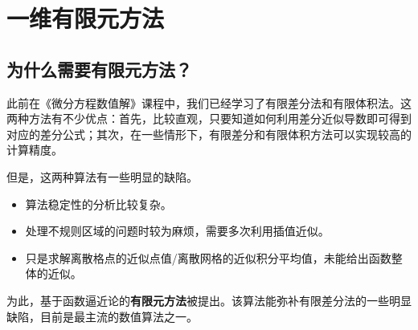 \chapter{一维有限元方法}
\section{为什么需要有限元方法？}
此前在《微分方程数值解》课程中，我们已经学习了有限差分法和有限体积法。这两种方法有不少优点：首先，比较直观，只要知道如何利用差分近似导数即可得到对应的差分公式；其次，在一些情形下，有限差分和有限体积方法可以实现较高的计算精度。

但是，这两种算法有一些明显的缺陷。
\begin{itemize}
  \item 算法稳定性的分析比较复杂。
  \item 处理不规则区域的问题时较为麻烦，需要多次利用插值近似。
  \item 只是求解离散格点的近似点值/离散网格的近似积分平均值，未能给出函数整体的近似。
\end{itemize}

为此，基于函数逼近论的\textbf{有限元方法}被提出。该算法能弥补有限差分法的一些明显缺陷，目前是最主流的数值算法之一。
